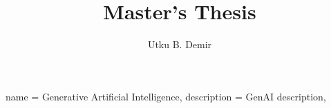 
\usepackage{glossaries}
\makeglossaries
{
  name =  Generative Artificial Intelligence,
  description = {GenAI description},
}


\title{Master's Thesis}
\author{Utku B. Demir}
